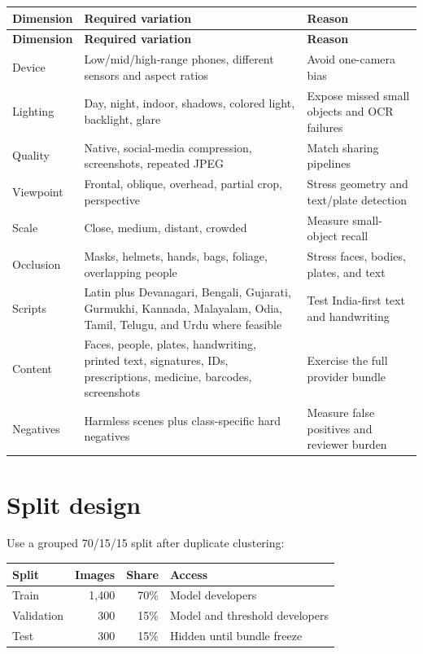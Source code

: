 \begin{longtable}{@{}L{34mm}L{44mm}L{69mm}@{}}
\toprule
\textbf{Dimension} & \textbf{Required variation} & \textbf{Reason} \\
\midrule
\endfirsthead
\toprule
\textbf{Dimension} & \textbf{Required variation} & \textbf{Reason} \\
\midrule
\endhead
Device & Low/mid/high-range phones, different sensors and aspect ratios & Avoid one-camera bias \\
Lighting & Day, night, indoor, shadows, colored light, backlight, glare & Expose missed small objects and OCR failures \\
Quality & Native, social-media compression, screenshots, repeated JPEG & Match sharing pipelines \\
Viewpoint & Frontal, oblique, overhead, partial crop, perspective & Stress geometry and text/plate detection \\
Scale & Close, medium, distant, crowded & Measure small-object recall \\
Occlusion & Masks, helmets, hands, bags, foliage, overlapping people & Stress faces, bodies, plates, and text \\
Scripts & Latin plus Devanagari, Bengali, Gujarati, Gurmukhi, Kannada, Malayalam, Odia, Tamil, Telugu, and Urdu where feasible & Test India-first text and handwriting \\
Content & Faces, people, plates, handwriting, printed text, signatures, IDs, prescriptions, medicine, barcodes, screenshots & Exercise the full provider bundle \\
Negatives & Harmless scenes plus class-specific hard negatives & Measure false positives and reviewer burden \\
\bottomrule
\end{longtable}

\section{Split design}

Use a grouped 70/15/15 split after duplicate clustering:

\begin{tabular}{@{}lrrl@{}}
\toprule
\textbf{Split} & \textbf{Images} & \textbf{Share} & \textbf{Access} \\
\midrule
Train & 1,400 & 70\% & Model developers \\
Validation & 300 & 15\% & Model and threshold developers \\
Test & 300 & 15\% & Hidden until bundle freeze \\
\bottomrule
\end{tabular}

